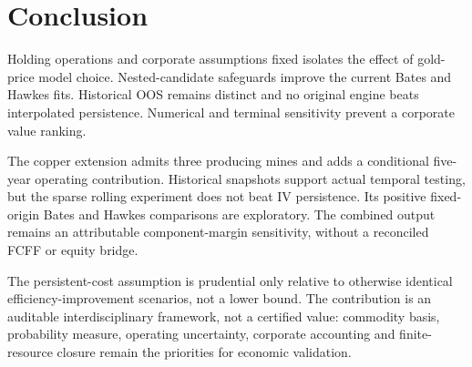 \section*{Conclusion}

Holding operations and corporate assumptions fixed isolates the effect of gold-price model choice. Nested-candidate safeguards improve the current Bates and Hawkes fits. Historical OOS remains distinct and no original engine beats interpolated persistence. Numerical and terminal sensitivity prevent a corporate value ranking.

The copper extension admits three producing mines and adds a conditional five-year operating contribution. Historical snapshots support actual temporal testing, but the sparse rolling experiment does not beat IV persistence. Its positive fixed-origin Bates and Hawkes comparisons are exploratory. The combined output remains an attributable component-margin sensitivity, without a reconciled FCFF or equity bridge.

The persistent-cost assumption is prudential only relative to otherwise identical efficiency-improvement scenarios, not a lower bound. The contribution is an auditable interdisciplinary framework, not a certified value: commodity basis, probability measure, operating uncertainty, corporate accounting and finite-resource closure remain the priorities for economic validation.
